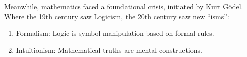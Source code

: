 Meanwhile, mathematics faced a foundational crisis, initiated by
\href{https://id.wikipedia.org/wiki/Kurt_G\%C3\%B6del}{Kurt Gödel}.
Where the 19th century saw Logicism, the 20th century saw new ``isms'':

\begin{enumerate}
\def\labelenumi{\arabic{enumi})}
\tightlist
\item
  Formalism: Logic is symbol manipulation based on formal rules.
\item
  Intuitionism: Mathematical truths are mental constructions.
\end{enumerate}
